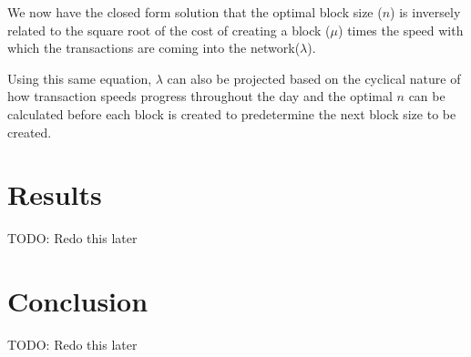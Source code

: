 \documentclass[conference]{IEEEtran}
\begin{document}
We now have the closed form solution that the optimal block size ($n$) is inversely related to
the square root of the cost of creating a block ($\mu$) times the speed with which the transactions 
are coming into the network($\lambda$). 

Using this same equation, $\lambda$ can also be projected based on the cyclical nature of how transaction
speeds progress throughout the day and the optimal $n$ can be calculated before each block is created to 
predetermine the next block size to be created. 
\fi

\section{Results}

TODO: Redo this later

\section{Conclusion}

TODO: Redo this later



\end{document}
